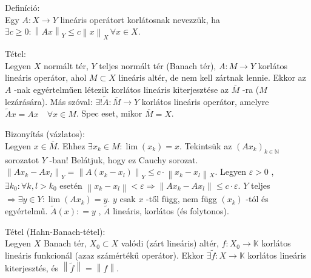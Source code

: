 \documentclass[12pt,a4paper]{scrartcl}
\newenvironment{definicio}{}{}
\newenvironment{tetel}{}{}
\newenvironment{bizonyitas}{}{}
\begin{document}
\begin{definicio}

Definíció:\\
Egy \(\left. A:X\rightarrow Y \right.\) lineáris operátort korlátosnak
nevezzük, ha
\(\exists c \geq 0:\left\| {Ax} \right\|_{Y} \leq c\left\| x \right\|_{X}\,\forall x \in X\).

\end{definicio}

\begin{tetel}

Tétel:\\
Legyen \(X\) normált tér, \(Y\) teljes normált tér (Banach tér),
\(\left. A:M\rightarrow Y \right.\) korlátos lineáris operátor, ahol
\(M \subset X\) lineáris altér, de nem kell zártnak lennie. Ekkor az
\(A\) -nak egyértelműen létezik korlátos lineáris kiterjesztése az
\(\overline{M}\) -ra (\(M\) lezárására). Más szóval:
\(\left. \exists!\widetilde{A}:\overline{M}\rightarrow Y \right.\)
korlátos lineáris operátor, amelyre
\(\widetilde{A}x = Ax\quad\forall x \in M\). Spec eset, mikor
\(\overline{M} = X\).

\end{tetel}

\begin{bizonyitas}

Bizonyítás (vázlatos):\\
Legyen \(x \in \overline{M}\). Ehhez
\(\exists x_{k} \in M:\lim\left( x_{k} \right) = x\). Tekintsük az
\(\left( {Ax_{k}} \right)_{k \in {\mathbb{N}}}\) sorozatot \(Y\) -ban!
Belátjuk, hogy ez Cauchy sorozat.
\(\left\| {Ax_{k} - Ax_{l}} \right\|_{Y} = \left\| {A\left( {x_{k} - x_{l}} \right)} \right\|_{Y} \leq c \cdot \left\| {x_{k} - x_{l}} \right\|{}_{X}\).
Legyen \(\varepsilon > 0\) , \(\exists k_{0}:\forall k,l > k_{0}\)
esetén
\(\left. \left\| {x_{k} - x_{l}} \right\| < \varepsilon\Rightarrow\left\| {Ax_{k} - Ax_{l}} \right\| \leq c \cdot \varepsilon \right.\).
\(Y\) teljes
\(\left. \Rightarrow\exists y \in Y:\lim\left( {Ax_{k}} \right) = y \right.\).
\(y\) csak \(x\) -től függ, nem függ \(\left( x_{k} \right)\) -tól és
egyértelmű. \(\widetilde{A}\left( x \right): = y\) , \(\widetilde{A}\)
lineáris, korlátos (és folytonos).

\end{bizonyitas}

\begin{tetel}

Tétel (Hahn-Banach-tétel):\\
Legyen \(X\) Banach tér, \(X_{0} \subset X\) valódi (zárt lineáris)
altér, \(\left. f:X_{0}\rightarrow{\mathbb{K}} \right.\) korlátos
lineáris funkcionál (azaz számértékű operátor). Ekkor
\(\left. \exists\widetilde{f}:X\rightarrow{\mathbb{K}} \right.\)
korlátos lineáris kiterjesztés, és
\(\left\| \widetilde{f} \right\| = \left\| f \right\|\).

\end{tetel}
\end{document}
